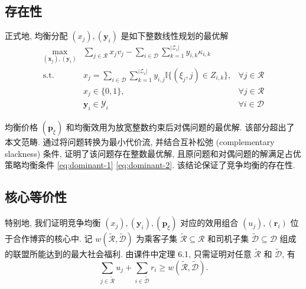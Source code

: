 \documentclass[10pt,twocolumn]{article}
\begin{document}
\subsection{存在性}

正式地, 均衡分配 $(x_j), (\mathbf{y}_i)$ 是如下整数线性规划的最优解
$$
  \begin{aligned}
    \max_{(\mathbf{x}_j), (\mathbf{y}_i)} & \sum_{j\in\mathcal{R}} x_j v_j - \sum_{i\in\mathcal{D}}\sum_{k=1}^{|\mathcal{Z}_i|} y_{i,k} \kappa_{i,k}                           \\
    \text{s.t.} \quad                     & x_j = \sum_{i\in\mathcal{D}}\sum_{k=1}^{|\mathcal{Z}_i|} y_{i,j} \mathbb{I}\{(\xi_j, j)\in Z_{i,k}\},    & \forall j\in\mathcal{R} \\
                                          & x_j \in \{0,1\},                                                                                         & \forall j\in\mathcal{R} \\
                                          & \mathbf{y}_i \in \mathcal{Y}_i                                                                           & \forall i\in\mathcal{D}
  \end{aligned}
$$

均衡价格 $(\mathbf{p}_\xi)$ 和均衡效用为放宽整数约束后对偶问题的最优解. 该部分超出了本文范畴. \citet{ma_spatio-temporal_2022} 通过将问题转换为最小代价流, 并结合互补松弛 (complementary slackness) 条件, 证明了该问题存在整数最优解, 且原问题和对偶问题的解满足占优策略均衡条件 \eqref{eq:dominant-1} \eqref{eq:dominant-2}. 该结论保证了竞争均衡的存在性.

\subsection{核心等价性}

特别地, 我们证明竞争均衡 $(x_j), (\mathbf{y}_i), (\mathbf{p}_\xi)$ 对应的效用组合 $(u_j), (\mathbf{r}_i)$ 位于合作博弈的核心中. 记 $w(\tilde{\mathcal{R}}, \tilde{\mathcal{D}})$ 为乘客子集 $\tilde{\mathcal{R}}\subseteq\mathcal{R}$ 和司机子集 $\tilde{\mathcal{D}}\subseteq\mathcal{D}$ 组成的联盟所能达到的最大社会福利. 由课件中定理 6.1, 只需证明对任意 $\tilde{\mathcal{R}}$ 和 $\tilde{\mathcal{D}}$, 有
$$
  \sum_{j\in\tilde{\mathcal{R}}} u_j + \sum_{i\in\tilde{\mathcal{D}}} r_i \ge w(\tilde{\mathcal{R}}, \tilde{\mathcal{D}}).
$$
\end{document}

